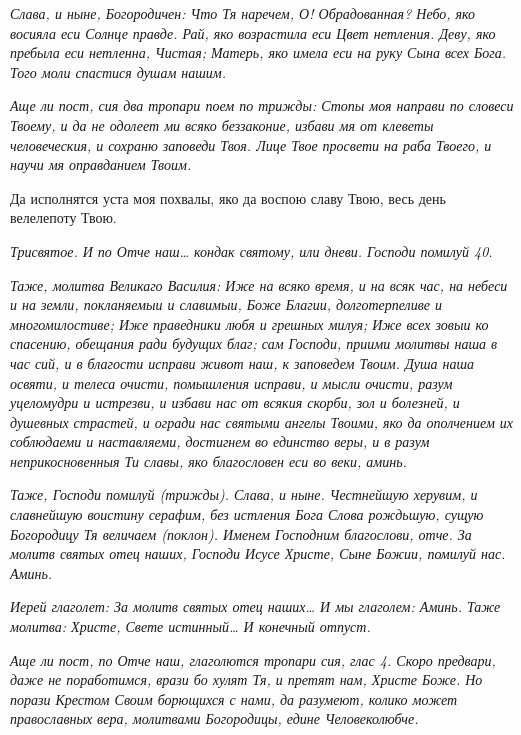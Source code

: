  \itshape Слава, и ныне\normalfont{}, \itshape Богородичен:\normalfont{} Что Тя наречем, О! Обрадованная? Небо,
яко восияла еси Солнце правде. Рай, яко возрастила еси Цвет нетления.
Деву, яко пребыла еси нетленна, Чистая; Матерь, яко имела еси на руку
Сына всех Бога. Того моли спастися душам нашим.


 \itshape Аще ли пост, сия два тропари поем по трижды:\normalfont{} Стопы моя направи по
словеси Твоему, и да не одолеет ми всяко беззаконие, избави мя от клеветы
человеческия, и сохраню заповеди Твоя. Лице Твое просвети на раба Твоего,
и научи мя оправданием Твоим.


   Да исполнятся уста моя похвалы, яко да воспою славу Твою, весь день
велелепоту Твою.


 \itshape Трисвятое\normalfont{}. \itshape И по\normalfont{} Отче наш… \itshape кондак святому, или дневи\normalfont{}. Господи помилуй
\itshape 40\normalfont{}.


 \itshape Таже, молитва Великаго Василия:\normalfont{} Иже на всяко время, и на всяк час, на
небеси и на земли, покланяемыи и славимыи, Боже Благии, долготерпеливе и
многомилостиве; Иже праведники любя и грешных милуя; Иже всех зовыи
ко спасению, обещания ради будущих благ; сам Господи, приими молитвы
наша в час сий, и в благости исправи живот наш, к заповедем Твоим. Душа
наша освяти, и телеса очисти, помышления исправи, и мысли очисти, разум
уцеломудри и истрезви, и избави нас от всякия скорби, зол и болезней, и
душевных страстей, и огради нас святыми ангелы Твоими, яко да
ополчением их соблюдаеми и наставляеми, достигнем во единство веры, и в
разум неприкосновенныя Ти славы, яко благословен еси во веки,
аминь.


 \itshape Таже\normalfont{}, Господи помилуй \itshape (трижды)\normalfont{}. \itshape Слава, и ныне\normalfont{}. Честнейшую херувим,
и славнейшую воистину серафим, без истления Бога Слова рождьшую,
сущую Богородицу Тя величаем \itshape (поклон)\normalfont{}. Именем Господним благослови,
отче. За молитв святых отец наших, Господи Исусе Христе, Сыне Божии,
помилуй нас. Аминь.


 \itshape Иерей глаголет:\normalfont{} За молитв святых отец наших… \itshape И мы глаголем:\normalfont{} Аминь.
\itshape Таже молитва:\normalfont{} Христе, Свете истинный… \itshape И конечный отпуст.\normalfont{}


 \itshape Аще ли пост, по Отче наш, глаголются тропари сия, глас 4.\normalfont{} Скоро
предвари, даже не поработимся, врази бо хулят Тя, и претят нам, Христе
Боже. Но порази Крестом Своим борющихся с нами, да разумеют,
колико может православных вера, молитвами Богородицы, едине
Человеколюбче.



